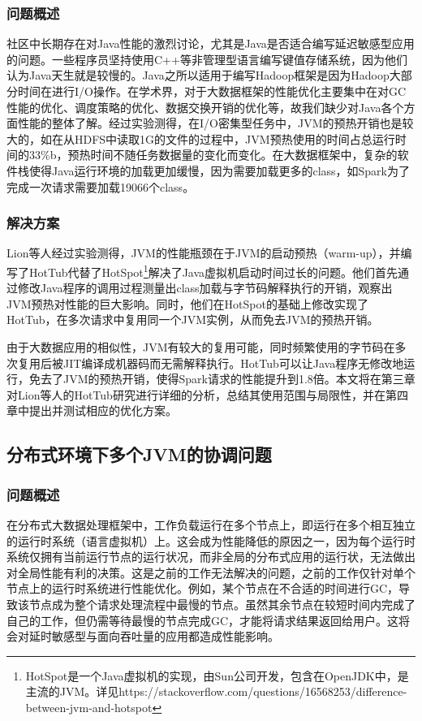 \documentclass[lang=cn,12pt,a4paper,cite=authoryear]{elegantpaper}
\begin{document}
\subsubsection{问题概述}
社区中长期存在对Java性能的激烈讨论，尤其是Java是否适合编写延迟敏感型应用的问题\cite{debate1,debate2,debate3,debate4}。一些程序员坚持使用C++等非管理型语言编写键值存储系统，因为他们认为Java天生就是较慢的。Java之所以适用于编写Hadoop框架是因为Hadoop大部分时间在进行I/O操作\cite{why}。在学术界，对于大数据框架的性能优化主要集中在对GC性能的优化、调度策略的优化、数据交换开销的优化等，故我们缺少对Java各个方面性能的整体了解。经过实验测得，在I/O密集型任务中，JVM的预热开销也是较大的，如在从HDFS中读取1G的文件的过程中，JVM预热使用的时间占总运行时间的33\%b\cite{DBLP:conf/osdi/LionCSZGY16}，预热时间不随任务数据量的变化而变化。在大数据框架中，复杂的软件栈使得Java运行环境的加载更加缓慢，因为需要加载更多的class，如Spark为了完成一次请求需要加载19066个class。

\subsubsection{解决方案}
Lion等人经过实验测得，JVM的性能瓶颈在于JVM的启动预热（warm-up），并编写了HotTub\cite{DBLP:conf/osdi/LionCSZGY16}代替了HotSpot\footnote{HotSpot是一个Java虚拟机的实现，由Sun公司开发，包含在OpenJDK中，是主流的JVM。详见https://stackoverflow.com/questions/16568253/difference-between-jvm-and-hotspot}解决了Java虚拟机启动时间过长的问题。他们首先通过修改Java程序的调用过程测量出class加载与字节码解释执行的开销，观察出JVM预热对性能的巨大影响。同时，他们在HotSpot的基础上修改实现了HotTub，在多次请求中复用同一个JVM实例，从而免去JVM的预热开销。

由于大数据应用的相似性，JVM有较大的复用可能，同时频繁使用的字节码在多次复用后被JIT编译成机器码而无需解释执行。HotTub可以让Java程序无修改地运行，免去了JVM的预热开销，使得Spark请求的性能提升到1.8倍。本文将在第三章对Lion等人的HotTub研究进行详细的分析，总结其使用范围与局限性，并在第四章中提出并测试相应的优化方案。

\subsection{分布式环境下多个JVM的协调问题}
\subsubsection{问题概述}
在分布式大数据处理框架中，工作负载运行在多个节点上，即运行在多个相互独立的运行时系统（语言虚拟机）上。这会成为性能降低的原因之一，因为每个运行时系统仅拥有当前运行节点的运行状况，而非全局的分布式应用的运行状，无法做出对全局性能有利的决策。这是之前的工作无法解决的问题，之前的工作仅针对单个节点上的运行时系统进行性能优化。例如，某个节点在不合适的时间进行GC，导致该节点成为整个请求处理流程中最慢的节点。虽然其余节点在较短时间内完成了自己的工作，但仍需等待最慢的节点完成GC，才能将请求结果返回给用户。这将会对延时敏感型与面向吞吐量的应用都造成性能影响。
\end{document}
